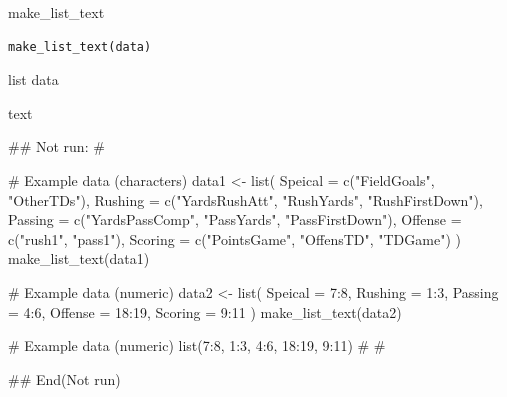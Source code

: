 \documentclass[a4paper]{book}
\begin{document}
%
\begin{Description}
make\_list\_text
\end{Description}
%
\begin{Usage}
\begin{verbatim}
make_list_text(data)
\end{verbatim}
\end{Usage}
%
\begin{Arguments}
\begin{ldescription}
\item[\code{data}] list data
\end{ldescription}
\end{Arguments}
%
\begin{Value}
text
\end{Value}
%
\begin{Examples}
\begin{ExampleCode}

\#\# Not run: 
\#

# Example data (characters)
data1 <- list(
  Speical = c("FieldGoals", "OtherTDs"),
  Rushing = c("YardsRushAtt", "RushYards", "RushFirstDown"),
  Passing = c("YardsPassComp", "PassYards", "PassFirstDown"),
  Offense = c("rush1", "pass1"),
  Scoring = c("PointsGame", "OffensTD", "TDGame")
)
make_list_text(data1)

# Example data (numeric)
data2 <- list(
  Speical = 7:8,
  Rushing = 1:3,
  Passing = 4:6,
  Offense = 18:19,
  Scoring = 9:11
)
make_list_text(data2)



# Example data (numeric)
list(7:8, 1:3, 4:6, 18:19, 9:11)%
\#
\#

## End(Not run)


\end{ExampleCode}
\end{Examples}
\end{document}
